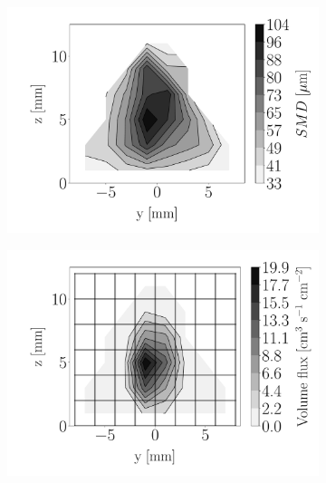 \begin{figure}[h!]
\centering\begin{subfigure}[b]{0.3\textwidth}
	\centering
   \includegraphics[scale=\scaleSLIJICF]{./part2_developments/figures_ch5_resolved_JICF/injectors_SLI/uG100_dx10_x10_SMD_map}
\end{subfigure}
   \hspace{0.17in}
\begin{subfigure}[b]{0.3\textwidth}
	\centering
   \includegraphics[scale=\scaleSLIJICF]{./part2_developments/figures_ch5_resolved_JICF/injectors_SLI/uG100_dx10_x10_volume_flux_map}
\end{subfigure}

\end{figure}
